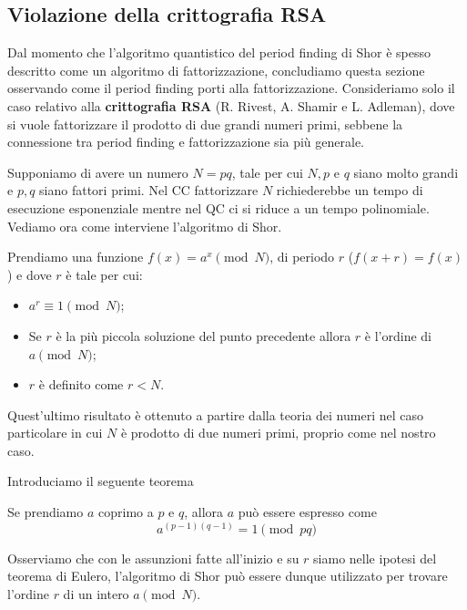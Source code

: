 
\newpage
\noindent{}
\vspace{0.5cm}
\subsection{Violazione della crittografia RSA}
Dal momento che l'algoritmo quantistico del period finding di Shor è spesso descritto come un algoritmo di fattorizzazione, concludiamo questa sezione osservando come il period finding porti alla fattorizzazione. Consideriamo solo il caso relativo alla \textbf{crittografia RSA} (R. Rivest, A. Shamir e L. Adleman), dove si vuole fattorizzare il prodotto di due grandi numeri primi, sebbene la connessione tra period finding e fattorizzazione sia più generale.

\noindent Supponiamo di avere un numero $N=pq$, tale per cui $N, p$ e $q$ siano molto grandi e $p,q$ siano fattori primi. Nel CC fattorizzare $N$ richiederebbe un tempo di esecuzione esponenziale mentre nel QC ci si riduce a un tempo polinomiale. Vediamo ora come interviene l'algoritmo di Shor.

\noindent Prendiamo una funzione $f(x)=a^x\pmod N$, di periodo $r$ ($f(x+r)=f(x)$) e dove $r$ è tale per cui:
\begin{itemize}
    \item $a^r\equiv1 \pmod N$;
    \item Se $r$ è la più piccola soluzione del punto precedente allora $r$ è l'ordine di $a\pmod N$;
    \item $r$ è definito come $r<N$.
\end{itemize}
Quest'ultimo risultato è ottenuto a partire dalla teoria dei numeri nel caso particolare in cui $N$ è prodotto di due numeri primi, proprio come nel nostro caso.

Introduciamo il seguente teorema

\begin{teorema}
    Se prendiamo $a$ coprimo a $p$ e $q$, allora $a$ può essere espresso come
    \begin{equation*}
        a^{(p-1)(q-1)}=1\pmod{pq}
    \end{equation*}
\end{teorema}

\noindent Osserviamo che con le assunzioni fatte all'inizio e su $r$ siamo nelle ipotesi del teorema di Eulero, l'algoritmo di Shor può essere dunque utilizzato per trovare l'ordine $r$ di un intero $a\pmod N$.

